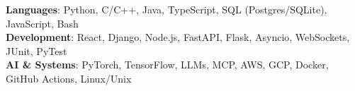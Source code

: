 \begin{itemize}[leftmargin=0.15in, label={}]
    \small{\item{
     \textbf{Languages}{: Python, C/C++, Java, TypeScript, SQL (Postgres/SQLite), JavaScript, Bash} \\
     \textbf{Development}{: React, Django, Node.js, FastAPI, Flask, Asyncio, WebSockets, JUnit, PyTest} \\
     \textbf{AI \& Systems}{: PyTorch, TensorFlow, LLMs, MCP, AWS, GCP, Docker, GitHub Actions, Linux/Unix}
    }}
\end{itemize}
